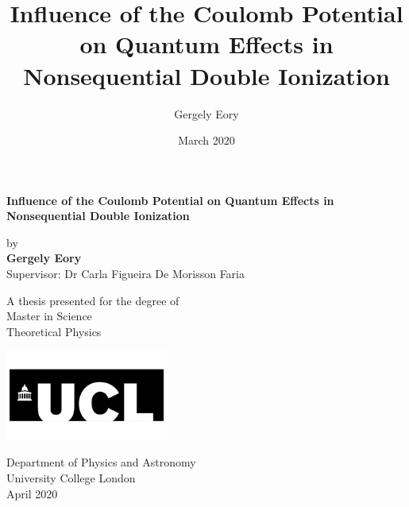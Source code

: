 \documentclass[11pt]{article}
\title{Influence of the Coulomb Potential on Quantum Effects in Nonsequential Double Ionization}
\author{Gergely Eory}
\date{March 2020}
\numberwithin{equation}{section}
\begin{document}
\begin{titlepage}
   \begin{center}
        \vspace*{1cm}
        
        \huge
        \textbf{Influence of the Coulomb Potential on Quantum Effects in Nonsequential Double Ionization}

        \large    
        \vspace{1.5cm}
        by\\
        \textbf{Gergely Eory}\\
        \vspace{0.5cm}
        Supervisor: Dr Carla Figueira De Morisson Faria
        \vfill
            
        A thesis presented for the degree of\\
        Master in Science\\
        Theoretical Physics
            
        \vspace{0.8cm}
     
        \includegraphics[width=0.4\textwidth]{Figures/university-college-london-ucl-vector-logo-xs.png}
            
        Department of Physics and Astronomy\\
        University College London\\
        April 2020
            
   \end{center}
\end{titlepage}
\end{document}
